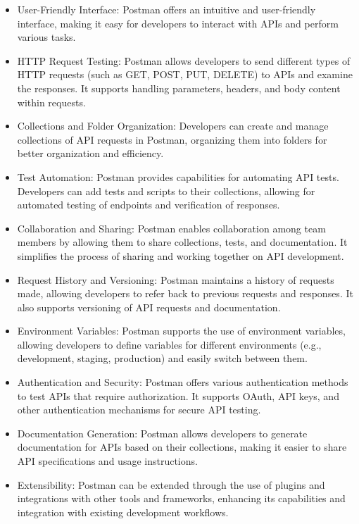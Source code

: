 \documentclass[twoside,twocolumn]{article}
\begin{document}
\begin{itemize}	
	\item User-Friendly Interface: Postman offers an intuitive and user-friendly interface, making it easy for developers to interact with APIs and perform various tasks.

\item HTTP Request Testing: Postman allows developers to send different types of HTTP requests (such as GET, POST, PUT, DELETE) to APIs and examine the responses. It supports handling parameters, headers, and body content within requests.

\item Collections and Folder Organization: Developers can create and manage collections of API requests in Postman, organizing them into folders for better organization and efficiency.

\item Test Automation: Postman provides capabilities for automating API tests. Developers can add tests and scripts to their collections, allowing for automated testing of endpoints and verification of responses.

\item Collaboration and Sharing: Postman enables collaboration among team members by allowing them to share collections, tests, and documentation. It simplifies the process of sharing and working together on API development.

\item Request History and Versioning: Postman maintains a history of requests made, allowing developers to refer back to previous requests and responses. It also supports versioning of API requests and documentation.

\item Environment Variables: Postman supports the use of environment variables, allowing developers to define variables for different environments (e.g., development, staging, production) and easily switch between them.

\item Authentication and Security: Postman offers various authentication methods to test APIs that require authorization. It supports OAuth, API keys, and other authentication mechanisms for secure API testing.

\item Documentation Generation: Postman allows developers to generate documentation for APIs based on their collections, making it easier to share API specifications and usage instructions.

\item Extensibility: Postman can be extended through the use of plugins and integrations with other tools and frameworks, enhancing its capabilities and integration with existing development workflows.
\end{itemize} 
\end{document}
